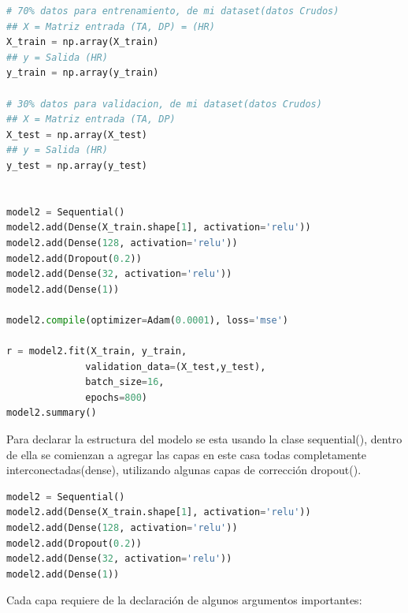 \begin{lstlisting}[language=Python, caption=Código prinipal, label={modeladotensorflow}]
# 70% datos para entrenamiento, de mi dataset(datos Crudos)
## X = Matriz entrada (TA, DP) = (HR)
X_train = np.array(X_train)
## y = Salida (HR)
y_train = np.array(y_train)

# 30% datos para validacion, de mi dataset(datos Crudos)
## X = Matriz entrada (TA, DP)
X_test = np.array(X_test)
## y = Salida (HR)
y_test = np.array(y_test)


model2 = Sequential()
model2.add(Dense(X_train.shape[1], activation='relu'))
model2.add(Dense(128, activation='relu'))
model2.add(Dropout(0.2))
model2.add(Dense(32, activation='relu'))
model2.add(Dense(1))

model2.compile(optimizer=Adam(0.0001), loss='mse')

r = model2.fit(X_train, y_train,
              validation_data=(X_test,y_test),
              batch_size=16,
              epochs=800)
model2.summary()
\end{lstlisting}
Para declarar la estructura del modelo se esta usando la clase sequential(),
dentro de ella se comienzan a agregar las capas en este casa todas
completamente interconectadas(dense), utilizando algunas capas de corrección
dropout().
\begin{lstlisting}[language=Python, caption=Declaración de la estructura del modelo]
model2 = Sequential()
model2.add(Dense(X_train.shape[1], activation='relu'))
model2.add(Dense(128, activation='relu'))
model2.add(Dropout(0.2))
model2.add(Dense(32, activation='relu'))
model2.add(Dense(1))
\end{lstlisting}
Cada capa requiere de la declaración de algunos argumentos importantes: 

